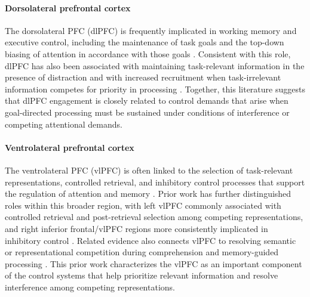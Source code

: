 \documentclass[10pt, twocolumn]{article}
\begin{document}
\paragraph{Dorsolateral prefrontal cortex}
The dorsolateral PFC (dlPFC) is frequently implicated in working memory and executive control, including the maintenance of task goals and the top-down biasing of attention in accordance with those goals \cite{Miller2001AnIT, Buschman2007TopDownVB}. Consistent with this role, dlPFC has also been associated with maintaining task-relevant information in the presence of distraction and with increased recruitment when task-irrelevant information competes for priority in processing \cite{Feredoes2011CausalEF, Milham2003CompetitionFP}. Together, this literature suggests that dlPFC engagement is closely related to control demands that arise when goal-directed processing must be sustained under conditions of interference or competing attentional demands.

\paragraph{Ventrolateral prefrontal cortex}
The ventrolateral PFC (vlPFC) is often linked to the selection of task-relevant representations, controlled retrieval, and inhibitory control processes that support the regulation of attention and memory \cite{Badre2007LeftVP, Aron2014InhibitionAT}. Prior work has further distinguished roles within this broader region, with left vlPFC commonly associated with controlled retrieval and post-retrieval selection among competing representations, and right inferior frontal/vlPFC regions more consistently implicated in inhibitory control \cite{Badre2007LeftVP, Aron2014InhibitionAT}. Related evidence also connects vlPFC to resolving semantic or representational competition during comprehension and memory-guided processing \cite{Glaser2013NeuralBO, Jefferies2013TheNB}. This prior work characterizes the vlPFC as an important component of the control systems that help prioritize relevant information and resolve interference among competing representations.

\end{document}
